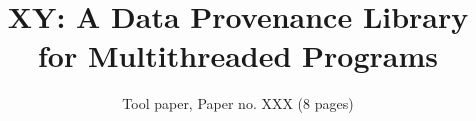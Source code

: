 \documentclass{IEEEtran}
\newcommand{\projecttitle}{\textsc{XY}\xspace}
\begin{document}
\author{
Tool paper, Paper no. XXX (8 pages)%
}

\title{\large \projecttitle: A Data Provenance Library for Multithreaded Programs}
\maketitle















\footnotesize


 
\end{document}

